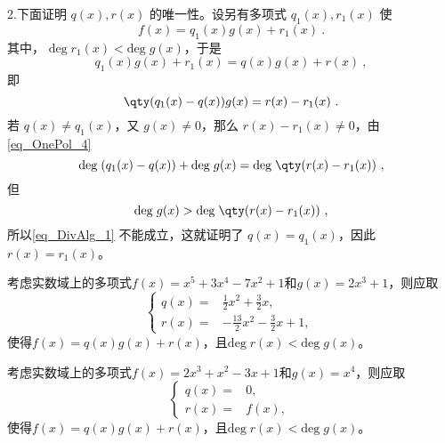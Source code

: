 2.下面证明 $q(x),r(x)$ 的唯一性。设另有多项式 $q_1(x),r_1(x)$ 使
\begin{equation}
f(x)=q_1(x)g(x)+r_1(x)~.
\end{equation}
其中， $\mathrm{deg}\;r_1(x)<\mathrm{deg}\;g(x)$，于是
\begin{equation}
q_1(x)g(x)+r_1(x)=q(x)g(x)+r(x)~,
\end{equation}
即
\begin{equation}
\qty(q_1(x)-q(x))g(x)=r(x)-r_1(x)~.
\end{equation}
若 $q(x)\neq q_1(x)$，又 $g(x)\neq 0$，那么 $r(x)-r_1(x)\neq 0$，由\autoref{eq_OnePol_4}~
\begin{equation}\label{eq_DivAlg_1}
\mathrm{deg}\;(q_1(x)-q(x))+\mathrm{deg}\;g(x)=\mathrm{deg}\;\qty(r(x)-r_1(x))~,
\end{equation}
但
\begin{equation}
\mathrm{deg}\;g(x)>\mathrm{deg}\;\qty(r(x)-r_1(x))~,
\end{equation}
所以\autoref{eq_DivAlg_1} 不能成立，这就证明了
$q(x)=q_1(x)$，因此 $r(x)=r_1(x)$。





\begin{example}{}
考虑实数域上的多项式$f(x)=x^5+3x^4-7x^2+1$和$g(x)=2x^3+1$，则应取
\begin{equation}
\left\{
\begin{aligned}
q(x) ={}& \frac{1}{2}x^2+\frac{3}{2}x , \\
r(x) ={}& -\frac{13}{2}x^2-\frac{3}{2}x+1 , 
\end{aligned}
\right. ~
\end{equation}
使得$f(x)=q(x)g(x)+r(x)$，且$\mathrm{deg}\;r(x)<\mathrm{deg}\;g(x)$。

\end{example}



\begin{example}{}
考虑实数域上的多项式$f(x)=2x^3+x^2-3x+1$和$g(x)=x^4$，则应取
\begin{equation}
\left\{
\begin{aligned}
q(x) ={}& 0 , \\
r(x) ={}& f(x) , 
\end{aligned}
\right. ~
\end{equation}
使得$f(x)=q(x)g(x)+r(x)$，且$\mathrm{deg}\;r(x)<\mathrm{deg}\;g(x)$。
\end{example}






